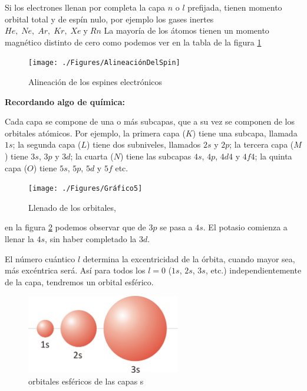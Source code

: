 Si los electrones llenan por completa la capa $n$ o $l$ prefijada, tienen momento orbital total y de espín nulo, por ejemplo los gases inertes $He,\; Ne,\; Ar,\; Kr,\; Xe\; \text{y}\; Rn$  La mayoría de los átomos tienen un momento magnético distinto de cero como podemos ver en la tabla de la figura \ref{fig:GraficoAlineaciónDelSpin}


\begin{figure}[H]
    \centering
    \texttt{[image: ./Figures/AlineaciónDelSpin]}
	\caption{Alineación de los espines electrónicos}
	\label{fig:GraficoAlineaciónDelSpin}
\end{figure}


\textbf{Recordando algo de química:}

Cada capa se compone de una o más subcapas, que a su vez se componen de los orbitales atómicos. Por ejemplo, la primera capa ($K$) tiene una subcapa, llamada $1s$; la segunda capa ($L$) tiene dos subniveles, llamados $2s$ y $2p$; la tercera capa ($M$) tiene $3s$, $3p$ y $3d$; la cuarta ($N$) tiene las subcapas $4s$, $4p$, $4d4$ y $4f4$; la quinta capa ($O$) tiene $5s$, $5p$, $5d$ y $5f$ etc.

\begin{figure}[H]
    \centering
    \texttt{[image: ./Figures/Gráfico5]}
	\caption{Llenado de los orbitales,}
	\label{fig:Grafico5}
\end{figure}

en la figura \ref{fig:Grafico5} podemos observar que de $3p$ se pasa a $4s$. El potasio comienza a llenar la $4s$, sin haber completado la $3d$.

El número cuántico $l$ determina la excentricidad de la órbita, cuando mayor sea, más excéntrica será.
Así para todos los $l=0$ ($1s$, $2s$, $3s$, etc.) independientemente de la capa, tendremos un orbital esférico.

\begin{figure}[H]
    \centering
    \includegraphics[width=0.6\textwidth]{./Figures/1S2S3S}
	\caption{orbitales esféricos de las capas s}
	\label{fig:Grafico1s2s3s}
\end{figure}

